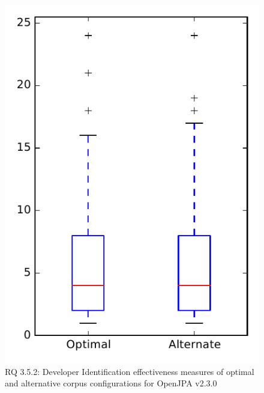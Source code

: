 
\begin{figure}
\centering
\includegraphics[height=0.4\textheight]{figures/combo/dit_rq2_openjpa}
\caption{RQ 3.5.2: Developer Identification effectiveness measures of optimal and alternative corpus configurations for OpenJPA v2.3.0}
\label{fig:combo:dit:rq2:openjpa}
\end{figure}
